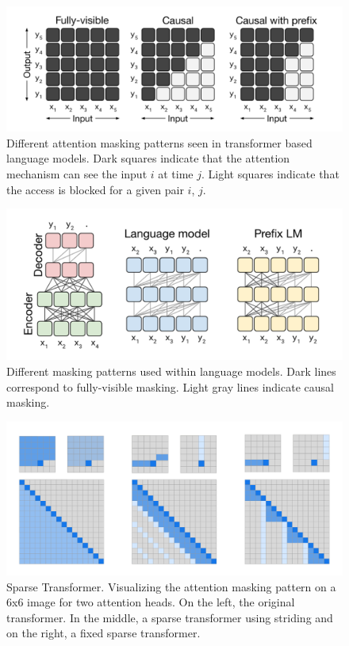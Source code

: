 \documentclass[twoside]{article}
\begin{document}
\begin{figure}[h]
  \centering
  \includegraphics*[scale=0.15]{img/attention_masking.png}
  \caption{
    Different attention masking patterns seen in transformer based language models.
    Dark squares indicate that the attention mechanism can see the input $i$ at time $j$.
    Light squares indicate that the access is blocked for a given pair $i$, $j$. 
    \cite{raffel_exploring_2020}
  }
\end{figure}
\begin{figure}[h]
  \centering
  \includegraphics*[scale=0.15]{img/lm_masking.png}
  \caption{
    Different masking patterns used within language models. Dark lines correspond to 
    fully-visible masking. Light gray lines indicate causal masking.
    \cite{raffel_exploring_2020}
  }
  \label{masking_patterns}
\end{figure}

\begin{figure}[h]
  \centering
  \includegraphics*[scale=0.1]{img/sparse_transformer.png}
  \caption{
    Sparse Transformer. Visualizing the attention masking pattern on a 6x6 image
    for two attention heads. On the left, the original transformer. In the middle,
    a sparse transformer using striding and on the right, a fixed sparse transformer.
    \cite{child_generating_2019}
  }
  \label{sparse_transformer}
\end{figure}
\end{document}

